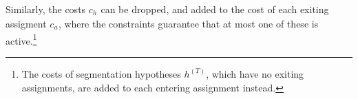 \documentclass[a4paper]{article}
\newcommand{\vh}[1][]{\ensuremath{h_{#1}}\xspace}
\newcommand{\vht}[1][t]{\ensuremath{h^{(#1)}}\xspace}
\newcommand{\va}[1][]{\ensuremath{a_{#1}}\xspace}
\begin{document}
Similarly, the costs $c_{\vh}$ can be dropped, and added to the cost of each exiting assigment $c_{\va}$, where the constraints guarantee that at most one of these is active.\footnote{%
The costs of segmentation hypotheses \vht[T], which have no exiting assignments, are added to each entering assignment instead.}
\end{document}
